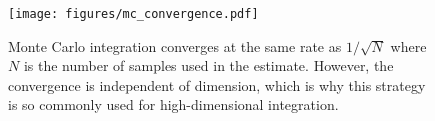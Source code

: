 \begin{figure}[H] %
\texttt{[image: figures/mc\_convergence.pdf]}
\caption{Monte Carlo integration converges at the same rate as $1/\sqrt{N}$ where $N$ is the number of samples used in the estimate.
However, the convergence is independent of dimension, which is why this strategy is so commonly used for high-dimensional integration.
}
\label{fig:monte-carlo-convergence}
\end{figure}

\begin{comment} %
\begin{problem}
Repeat the experiment of Problem \ref{prob:mc-point-convergence}, but fix $N=10^4$ and define $\Omega_n$ to be the $n$-dimensional cube $[-1,1]\times[-1,1]\times\cdots\times[-1,1]$.
For $n=5,10,20,\ldots,100$, redefine $f$ and $\Omega_n$ to fit the dimension, use SciPy to compute the correct value of the integral $F_n$, use your function from Problem \ref{} to estimate the integral, and compute the relative error.

Plot the dimension against the relative error.
\end{problem}
\end{comment}

\begin{comment}
\begin{problem}
Create a new function (based upon the function from Problem \ref{prob:montecarlo-integration-nd}) that uses a ``flawed'' random number generator that doesn't produce numbers between $-.95$ and $-1$.
Test your method on the function from Problem \ref{prob:mc_test}.
How bad is the error?
\label{prob:mc_flawed}
\end{problem}
\end{comment}

